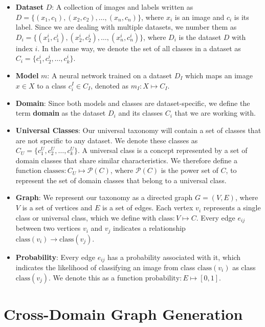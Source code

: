 \begin{itemize}
    \item \textbf{Dataset} $D$: A collection of images and labels
          written as $D = \{(x_1, c_1), (x_2, c_2), \ldots, (x_n, c_n)\}$,
          where $x_i$ is an image and $c_i$ is its label.
          Since we are dealing with multiple datasets, we number them
          as $D_i = \{(x_1^i, c_1^i), (x_2^i, c_2^i), \ldots, (x_n^i, c_n^i)\}$,
          where $D_i$ is the dataset $D$ with index $i$.
          In the same way, we denote the set of all classes in a dataset as $C_i = \{c_1^i, c_2^i, \ldots, c_k^i\}$.
    \item \textbf{Model} $m$: A neural network trained on a dataset $D_I$
          which maps an image $x\in X$ to a class $c_i^I\in C_I$, denoted as $m_I: X \mapsto C_I$.
    \item \textbf{Domain}: Since both models and classes are dataset-specific,
          we define the term \textbf{domain} as the dataset $D_i$ and its classes $C_i$
          that we are working with.
    \item \textbf{Universal Classes}: Our universal taxonomy will contain a set of classes
          that are not specific to any dataset.
          We denote these classes as $C_U = \{c_1^U, c_2^U, \ldots, c_k^U\}$.
          A universal class is a concept represented by a set of domain classes
          that share similar characteristics. We therefore define a function
          $\text{classes}: C_U \mapsto \mathcal{P}(C)$, where $\mathcal{P}(C)$ is the power set of $C$,
          to represent the set of domain classes that belong to a universal class.
    \item \textbf{Graph}: We represent our taxonomy as a directed graph $G = (V, E)$,
          where $V$ is a set of vertices and $E$ is a set of edges.
          Each vertex $v_i$ represents a single class or universal class,
          which we define with $\text{class}: V \mapsto C$.
          Every edge $e_{ij}$ between two vertices $v_i$ and $v_j$ indicates
          a relationship $\text{class}(v_i) \rightarrow \text{class}(v_j)$.
    \item \textbf{Probability}: Every edge $e_{ij}$ has a probability associated with it,
          which indicates the likelihood of classifying an image from class $\text{class}(v_i)$
          as class $\text{class}(v_j)$.
          We denote this as a function $\text{probability}: E \mapsto [0, 1]$.
\end{itemize}

\section{Cross-Domain Graph Generation} \label{sec:graph_construction}

